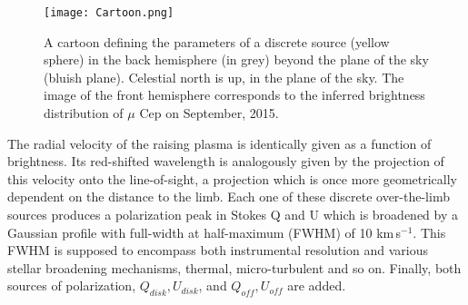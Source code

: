 \documentclass{/Users/art2/TeX/aanda/aa}
\def\kms {km\,s$^{-1}$}
\begin{document}
\begin{figure}
\texttt{[image: Cartoon.png]}
\caption{A cartoon defining the parameters of a discrete source (yellow sphere) in the back hemisphere (in grey) beyond the plane of the sky (bluish plane). Celestial north is up, in the plane of the sky. The image of the front hemisphere corresponds to the inferred brightness distribution of $\mu$ Cep on September, 2015.}
\label{cartoon}
\end{figure}

The radial velocity of the raising plasma is identically given as a function of brightness.  Its red-shifted wavelength is analogously given by the projection of this velocity onto the line-of-sight, a projection which is once more geometrically dependent on the distance to the limb. Each one of these discrete over-the-limb sources produces a polarization peak in Stokes Q and U which is broadened by a Gaussian profile with full-width at half-maximum (FWHM) of 10 \kms. This FWHM is supposed to encompass both instrumental resolution and various stellar broadening mechanisms, thermal, micro-turbulent and so on.  Finally, both sources of polarization, $Q_{disk}, U_{disk}$, and $Q_{\mathit{off}}, U_{\mathit{off}}$ are added.
\end{document}
